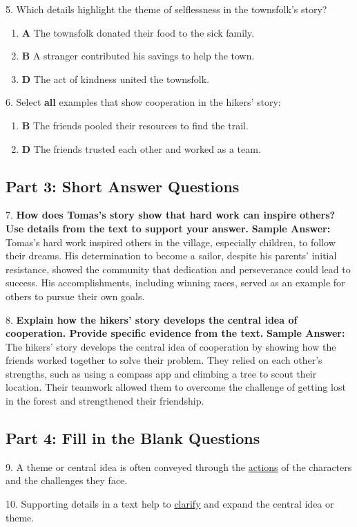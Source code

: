 \documentclass[12pt]{article}
\begin{document}
5. Which details highlight the theme of selflessness in the townsfolk’s story?  
\begin{enumerate}[label=\Alph*.]
    \item \textbf{A} The townsfolk donated their food to the sick family.  
    \item \textbf{B} A stranger contributed his savings to help the town.  
    \item \textbf{D} The act of kindness united the townsfolk.  
\end{enumerate}

6. Select \textbf{all} examples that show cooperation in the hikers’ story:  
\begin{enumerate}[label=\Alph*.]
    \item \textbf{B} The friends pooled their resources to find the trail.  
    \item \textbf{D} The friends trusted each other and worked as a team.  
\end{enumerate}

\subsection*{Part 3: Short Answer Questions}

7. \textbf{How does Tomas’s story show that hard work can inspire others? Use details from the text to support your answer.}
\textbf{Sample Answer:} Tomas’s hard work inspired others in the village, especially children, to follow their dreams. His determination to become a sailor, despite his parents’ initial resistance, showed the community that dedication and perseverance could lead to success. His accomplishments, including winning races, served as an example for others to pursue their own goals.

8. \textbf{Explain how the hikers’ story develops the central idea of cooperation. Provide specific evidence from the text.}
\textbf{Sample Answer:} The hikers’ story develops the central idea of cooperation by showing how the friends worked together to solve their problem. They relied on each other’s strengths, such as using a compass app and climbing a tree to scout their location. Their teamwork allowed them to overcome the challenge of getting lost in the forest and strengthened their friendship.

\subsection*{Part 4: Fill in the Blank Questions}

9. A theme or central idea is often conveyed through the \underline{actions} of the characters and the challenges they face.

10. Supporting details in a text help to \underline{clarify} and expand the central idea or theme.
\end{document}
